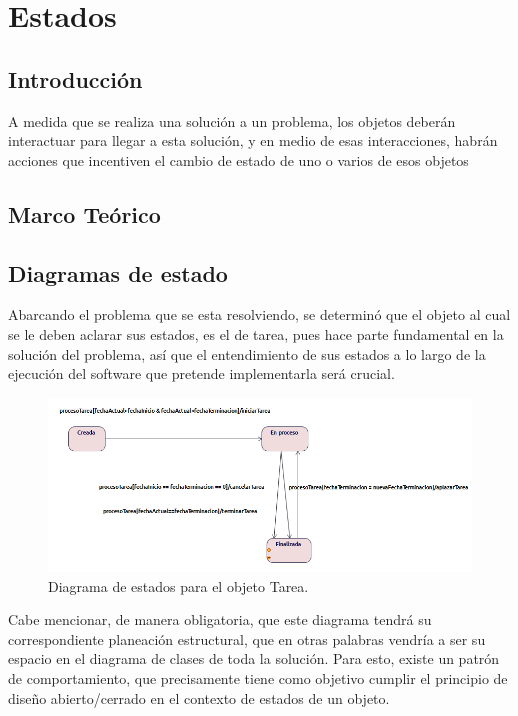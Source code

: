 \chapter{Estados}
\section{Introducción}
A medida que se realiza una solución a un problema, los objetos deberán interactuar para llegar a esta solución, y en medio de esas interacciones, habrán acciones que incentiven el cambio de estado de uno o varios de esos objetos
\newpage
\section{Marco Teórico}

\section{Diagramas de estado}
Abarcando el problema que se esta resolviendo, se determinó que el objeto al cual se le deben aclarar sus estados, es el de tarea, pues hace parte fundamental en la solución del problema, así que el entendimiento de sus estados a lo largo de la ejecución del software que pretende implementarla será crucial.

\begin{figure}[H]
	\centering
	\includegraphics[width=1\linewidth]{diseno/estados/imgs/estadosTarea}
	\caption{Diagrama de estados para el objeto Tarea.}
	\label{fig:gantt}
\end{figure}

Cabe mencionar, de manera obligatoria, que este diagrama tendrá su correspondiente planeación estructural, que en otras palabras vendría a ser su espacio en el diagrama de clases de toda la solución. Para esto, existe un patrón de comportamiento, que precisamente tiene como objetivo cumplir el principio de diseño abierto/cerrado en el contexto de estados de un objeto.

